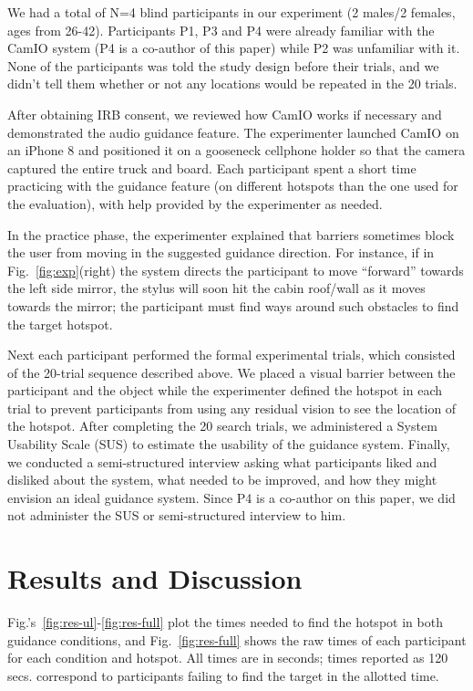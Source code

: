 \documentclass[runningheads]{res/templates/llncs}
\begin{document}
We had a total of N=4 blind participants in our experiment (2 males/2 females, ages from 26-42).
Participants P1, P3 and P4 were already familiar with the CamIO system (P4 is a co-author of this paper) while P2 was unfamiliar with it. 
None of the participants was told the study design before their trials, and we didn't tell them whether or not any locations would be repeated in the 20 trials. 

After obtaining IRB consent, we reviewed how CamIO works if necessary and demonstrated the audio guidance feature. 
The experimenter launched CamIO on an iPhone 8 and positioned it on a gooseneck cellphone holder so that the camera captured the entire truck and board. 
Each participant spent a short time practicing with the guidance feature (on different hotspots than the one used for the evaluation), with help provided by the experimenter as needed.

In the practice phase, the experimenter explained that barriers sometimes block the user from moving in the suggested guidance direction. 
For instance, if in Fig.~\ref{fig:exp}(right) the system directs the participant to move ``forward'' towards the left side mirror, the stylus will soon hit the cabin roof/wall as it moves towards the mirror; the participant must find ways around such obstacles to find the target hotspot. 

Next each participant performed the formal experimental trials, which consisted of the 20-trial sequence described above. 
We  placed a visual barrier between the participant and the object while the experimenter defined the hotspot in each trial to prevent participants from using any residual vision to see the location of the hotspot. After completing the 20 search trials, we administered a System Usability Scale (SUS) \cite{brooke1996sus} to estimate the usability of the guidance system. 
Finally, we conducted a semi-structured interview asking what participants liked and disliked about the system, what needed to be improved, and how they might envision an ideal guidance system. Since P4 is a co-author on this paper, we did not administer the SUS or semi-structured interview to him.

\hypertarget{results}{%
\section{Results and Discussion}\label{results}}

Fig.'s~\ref{fig:res-ul}-\ref{fig:res-full} plot the times needed to find the hotspot in both guidance conditions, and Fig.~\ref{fig:res-full} shows the raw times of each participant for each condition and hotspot. All times are in seconds; times reported as 120 secs. correspond to participants failing to find the target in the allotted time.
\end{document}
